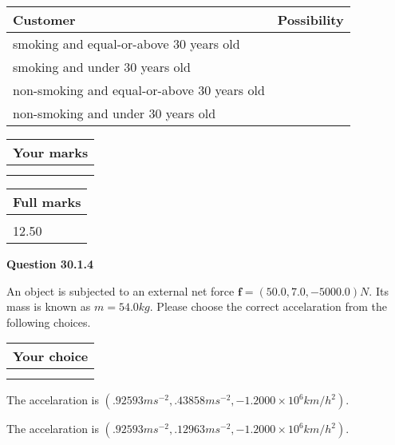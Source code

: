 \documentclass[12pt]{article}
\begin{document}
\noindent
\begin{tabular}{|l|l|}
\hline
Customer & Possibility \\
\hline
smoking  and   %
equal-or-above 30 years old  & \\
\hline
smoking  and   %
under 30 years old & \\
\hline
 non-smoking and   %
equal-or-above 30 years old  & \\
\hline
 non-smoking and  %
under 30 years old & \\
\hline
\end{tabular}
 
 
 

 

 
\vspace{0.3in}
  
\vspace{0.2in}
  
         \begin{tabular}{|l|}
\hline
 Your marks  \\
\hline
 \\ 
 \\ 
\hline
\end{tabular}
\hspace{0.05in} \begin{tabular}{|l|}
\hline
 Full marks  \\
\hline
 \\ 
12.50 \\
\hline
\end{tabular}
{\textbf{\Large{Question
30.1.4 
}}}
  
  
 
An object is subjected to an external net force $\mathbf{f}=(
50.0 ,
7.0,
-5000.0  )N$. Its mass is known as
$m= %
54.0  kg$. Please choose the correct accelaration
from the following choices.
 
  
  
\noindent\hspace{3.0in} \begin{tabular}{|l|}
\hline
Your choice \\
\hline
 \\ 
 \\ 
\hline
\end{tabular}
  
  
 
 
The accelaration is
$(
.92593ms^{-2},
.43858ms^{-2},
-1.2000 \times 10^{6}km/h^2
).
$
 
 
The accelaration is
$(
.92593ms^{-2},
.12963ms^{-2},
-1.2000 \times 10^{6}km/h^2
).
$
 
\end{document}
